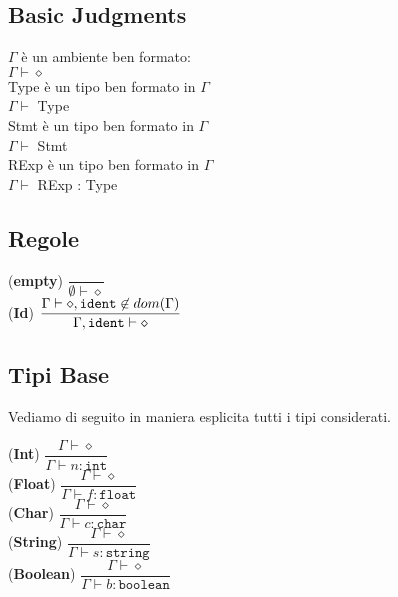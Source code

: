 \documentclass[12pt]{article}
\begin{document}
\subsection*{Basic Judgments}
\begin{center}
$\Gamma$ è un ambiente ben formato:\\
$\Gamma \vdash \diamond$\\[0.1in]
Type è un tipo ben formato in $\Gamma$\\
$\Gamma \vdash $ Type\\[0.1in]
Stmt è un tipo ben formato in $\Gamma$\\
$\Gamma \vdash $ Stmt\\[0.1in]
RExp è un tipo ben formato in $\Gamma$\\
$\Gamma \vdash $ RExp : Type\\[0.1in]
\end{center}

\subsection*{Regole}
\begin{center}
\noindent (\textbf{empty})
$\dfrac{}{\emptyset \vdash \diamond}$\\[0.2in]
\noindent (\textbf{Id})
$\dfrac{\Gamma \vdash \diamond , \texttt{\texttt{ident}} \not\in dom(\Gamma)}{\Gamma, \texttt{\texttt{ident}} \vdash \diamond}$\\[0.1in]
\end{center}
\subsection*{Tipi Base}
Vediamo di seguito in maniera esplicita tutti i tipi considerati.
\begin{center}
\noindent(\textbf{Int})
$\dfrac{\Gamma \vdash \diamond}{\Gamma \vdash n : \texttt{int}}$\\[0.1in]
\noindent(\textbf{Float})
$\dfrac{\Gamma \vdash \diamond}{\Gamma \vdash f : \texttt{float}}$\\[0.1in]
\noindent(\textbf{Char})
$\dfrac{\Gamma \vdash \diamond}{\Gamma \vdash c : \texttt{char}}$\\[0.1in]
\noindent(\textbf{String})
$\dfrac{\Gamma \vdash \diamond}{\Gamma \vdash s : \texttt{string}}$\\[0.1in]
\noindent(\textbf{Boolean})
$\dfrac{\Gamma \vdash \diamond}{\Gamma \vdash b : \texttt{boolean}}$\\[0.1in]
\end{center}
\end{document}
